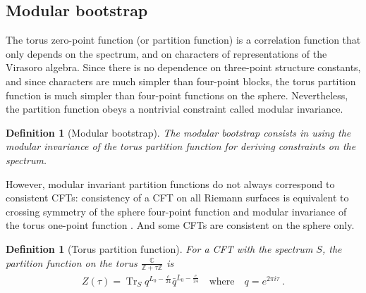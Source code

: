 \documentclass[12pt, a4paper]{article}
\theoremstyle{break}
\newtheorem{defn}[exo]{Definition}
\begin{document}
\subsection{Modular bootstrap}\label{sec:mb}

The torus zero-point function (or partition function) is a correlation function that only depends on the spectrum, and on characters of representations of the Virasoro algebra. Since there is no dependence on three-point structure constants, and since characters are much simpler than four-point blocks, the torus partition function is much simpler than four-point functions on the sphere. Nevertheless, the partition function obeys a nontrivial constraint called modular invariance.

\begin{defn}[Modular bootstrap]
The modular bootstrap consists in using the modular invariance of the torus partition function for deriving constraints on the spectrum.
\end{defn}
However, modular invariant partition functions do not always correspond to consistent CFTs: consistency of a CFT on all Riemann surfaces is equivalent to crossing symmetry of the sphere four-point function and modular invariance of the torus one-point function \cite{ms89b}. And some CFTs are consistent on the sphere only.

\begin{defn}[Torus partition function]
 For a CFT with the spectrum $S$, the partition function on the torus $\frac{\mathbb{C}}{\mathbb{Z}+\tau \mathbb{Z}}$ is 
 \begin{align}
  Z(\tau) = \operatorname{Tr}_S q^{L_0-\frac{c}{24}}\bar q^{\bar L_0-\frac{c}{24}}\quad \text{where} \quad q=e^{2\pi i \tau}\ .
 \end{align}
\end{defn}
\end{document}
